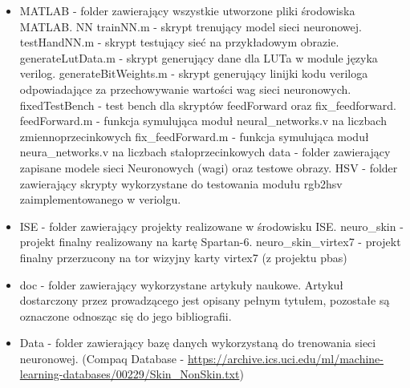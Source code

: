 \begin{itemize}
\item MATLAB - folder zawierający wszystkie utworzone pliki środowiska MATLAB.
\subitem NN
\subsubitem trainNN.m - skrypt trenujący model sieci neuronowej.
\subsubitem testHandNN.m - skrypt testujący sieć na przykładowym obrazie.
\subsubitem generateLutData.m - skrypt generujący dane dla LUTa w module języka verilog.
\subsubitem generateBitWeights.m - skrypt generujący linijki kodu veriloga odpowiadające za przechowywanie wartości wag sieci neuronowych.
\subsubitem fixedTestBench - test bench dla skryptów feedForward oraz fix\_feedforward.
\subsubitem feedForward.m - funkcja symulująca moduł neural\_networks.v na liczbach zmiennoprzecinkowych
\subsubitem fix\_feedForward.m - funkcja symulująca moduł neura\_networks.v na liczbach stałoprzecinkowych
\subsubitem data - folder zawierający zapisane modele sieci Neuronowych (wagi) oraz testowe obrazy.
\subitem HSV - folder zawierający skrypty wykorzystane do testowania modułu rgb2hsv zaimplementowanego w veriolgu.
\item ISE - folder zawierający projekty realizowane w środowisku ISE.
\subitem neuro\_skin - projekt finalny realizowany na kartę Spartan-6.
\subitem neuro\_skin\_virtex7 - projekt finalny przerzucony na tor wizyjny karty virtex7 (z projektu pbas)
\item doc - folder zawierający wykorzystane artykuły naukowe. Artykuł dostarczony przez prowadzącego jest opisany pełnym tytułem, pozostałe są oznaczone odnosząc się do jego bibliografii.
\item Data - folder zawierający bazę danych wykorzystaną do trenowania sieci neuronowej. (Compaq Database - \url{https://archive.ics.uci.edu/ml/machine-learning-databases/00229/Skin_NonSkin.txt})
\end{itemize}
